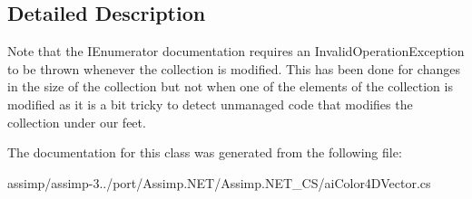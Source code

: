 \subsection{Detailed Description}
Note that the I\+Enumerator documentation requires an Invalid\+Operation\+Exception to be thrown whenever the collection is modified. This has been done for changes in the size of the collection but not when one of the elements of the collection is modified as it is a bit tricky to detect unmanaged code that modifies the collection under our feet. 

The documentation for this class was generated from the following file\+:\begin{DoxyCompactItemize}
\item 
assimp/assimp-\/3../port/\+Assimp.\+N\+E\+T/\+Assimp.\+N\+E\+T\+\_\+\+C\+S/ai\+Color4\+D\+Vector.\+cs\end{DoxyCompactItemize}
